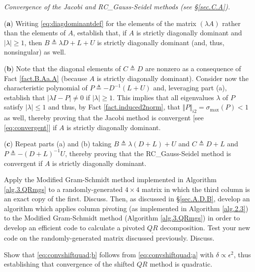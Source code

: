 \begin{exercise} \label{ex.4.Jacobi.RC_Gauss-Seidel} \rm {\it Convergence of the Jacobi and RC_Gauss-Seidel methods (see \S \ref{sec.C.A}).}\vskip0.05in

\noindent ({\bf a}) Writing \eqref{eq:diagdominantdef} for the elements of the matrix $(\lambda A)$ rather than the elements of $A$,
establish that, if $A$ is strictly diagonally dominant and
$|\lambda|\ge 1$, then $B\triangleq \lambda D+L+U$ is strictly diagonally dominant (and, thus, nonsingular) as well.\vskip0.1in

\noindent ({\bf b}) Note that the diagonal elements of $C\triangleq D$ are nonzero as a consequence of Fact \ref{fact.B.Aa.A} (because $A$ is strictly diagonally dominant).
Consider now the characteristic polynomial of $P\triangleq -D^{-1}(L+U)$ and, leveraging part (a), establish that $|\lambda I - P|\ne 0$ if $|\lambda|\ge 1$.  This implies that all eigenvalues
$\lambda$ of $P$ satisfy $|\lambda|\le 1$ and thus, by Fact \ref{fact.induced2norm}, that $\Vert P\Vert_{i2} = \sigma_{\textrm{max}}(P)<1$ as well,
thereby proving that the Jacobi method is convergent [see \eqref{eq:convergent}] if $A$ is strictly diagonally dominant.\vskip0.1in

\noindent ({\bf c}) Repeat parts (a) and (b) taking $B\triangleq \lambda (D+L)+U$ and $C\triangleq D+L$ and $P\triangleq -(D+L)^{-1} U$,
thereby proving that the RC_Gauss-Seidel method is convergent if $A$ is strictly diagonally dominant.
\end{exercise}

\begin{exercise} \label{ex:04.QRmgspivot} \rm Apply the Modified Gram-Schmidt method implemented in Algorithm \ref{alg.3.QRmgs} to a randomly-generated $4\times 4$ matrix in which the third column is an exact copy of the first.  Discuss.
Then, as discussed in \S \ref{sec.A.D.B}, develop an algorithm which applies column pivoting (as implemented in Algorithm \ref{alg.2.3}) to the Modified Gram-Schmidt method (Algorithm \ref{alg.3.QRmgs})
in order to develop an efficient code to calculate a pivoted $\underline{QR}$ decomposition.  Test your new code on the randomly-generated matrix discussed previously.  Discuss.
\end{exercise}

\begin{exercise} \label{ex:04.convshiftquad} \rm Show that \eqref{eq:convshiftquad;b} follows from \eqref{eq:convshiftquad;a} with $\delta \propto \epsilon^2$,
thus establishing that convergence of the shifted $QR$ method is quadratic.
\end{exercise}

